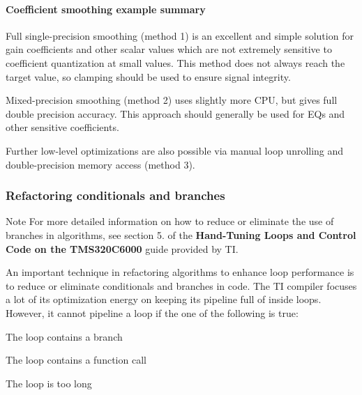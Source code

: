 \hypertarget{a00362_subsubsection__coefficient_smoothing_example_summary_}{}\paragraph{Coefficient smoothing example summary}\label{a00362_subsubsection__coefficient_smoothing_example_summary_}
 
\begin{DoxyItemize}
\item Full single-\/precision smoothing (method 1) is an excellent and simple solution for gain coefficients and other scalar values which are not extremely sensitive to coefficient quantization at small values. This method does not always reach the target value, so clamping should be used to ensure signal integrity.  
\item Mixed-\/precision smoothing (method 2) uses slightly more C\+P\+U, but gives full double precision accuracy. This approach should generally be used for E\+Qs and other sensitive coefficients.  
\item Further low-\/level optimizations are also possible via manual loop unrolling and double-\/precision memory access (method 3).  
\end{DoxyItemize}

\hypertarget{a00362_subsection__refactoring_conditionals_and_branches}{}\subsubsection{Refactoring conditionals and branches}\label{a00362_subsection__refactoring_conditionals_and_branches}
 \begin{DoxyNote}{Note}
For more detailed information on how to reduce or eliminate the use of branches in algorithms, see section 5. of the {\bfseries Hand-\/\+Tuning Loops and Control Code on the T\+M\+S320\+C6000} guide provided by T\+I.
\end{DoxyNote}
An important technique in refactoring algorithms to enhance loop performance is to reduce or eliminate conditionals and branches in code. The T\+I compiler focuses a lot of its optimization energy on keeping its pipeline full of inside loops. However, it cannot pipeline a loop if the one of the following is true\+:


\begin{DoxyItemize}
\item The loop contains a branch  
\item The loop contains a function call  
\item The loop is too long  
\end{DoxyItemize}


